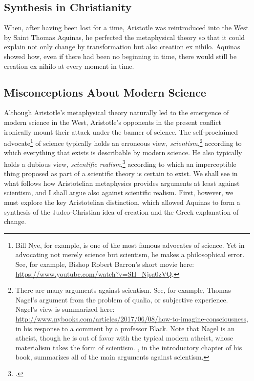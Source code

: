 \documentclass[twocolumn]{article}
\begin{document}
\subsection{Synthesis in Christianity}

When, after having been lost for a time, Aristotle was reintroduced into the
West by Saint Thomas Aquinas, he perfected the metaphysical theory so that it
could explain not only change by transformation but also creation ex nihilo.
Aquinas showed how, even if there had been no beginning in time, there would
still be creation ex nihilo at every moment in time.

\subsection{Misconceptions About Modern Science}

Although Aristotle's metaphysical theory naturally led to the emergence of
modern science in the West, Aristotle's opponents in the present conflict
ironically mount their attack under the banner of science.  The self-proclaimed
advocate\footnote{%
   Bill Nye, for example, is one of the most famous advocates of science.  Yet
   in advocating not merely science but scientism, he makes a philosophical
   error.  See, for example, Bishop Robert Barron's short movie here:
   \url{https://www.youtube.com/watch?v=SH_Njsa0zVQ}.%
}
of science typically holds an erroneous view, \emph{scientism},\footnote{%
   There are many arguments against scientism.  See, for example, Thomas
   Nagel's argument from the problem of qualia, or subjective experience.
   Nagel's view is summarized here:
   \url{http://www.nybooks.com/articles/2017/06/08/how-to-imagine-consciousness},
   in his response to a comment by a professor Black.  Note that Nagel is an
   atheist, though he is out of favor with the typical modern atheist, whose
   materialism takes the form of scientism.  \cite{f2014}, in the introductory
   chapter of his book, summarizes all of the main arguments against
   scientism.%
}
according to which everything that exists is describable by modern science. He
also typically holds a dubious view, \emph{scientific realism},\footnote{%
   \cite{c2016}.
}
according to which an imperceptible thing proposed as part of a scientific
theory is certain to exist.  We shall see in what follows how Aristotelian
metaphysics provides arguments at least against scientism, and I shall argue
also against scientific realism.  First, however, we must explore the key
Aristotelian distinction, which allowed Aquinas to form a synthesis of the
Judeo-Christian idea of creation and the Greek explanation of change.
\end{document}
